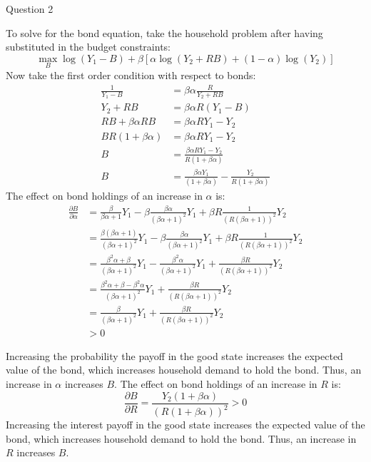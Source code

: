 \documentclass[a4paper]{article}
\newif\IfInSansMode
\begin{document}
\begin{questionbox}{Question 2}
\begin{enumerate}[(a)]
\begin{explanationbox}
					To solve for the bond equation, take the household problem after having substituted in the budget constraints:
					\[
						\max_B \log (Y_1 - B) + \beta \left[ \alpha \log (Y_2 + RB) + (1-\alpha)\log (Y_2) \right]
					\]
					Now take the ﬁrst order condition with respect to bonds:
					\begin{align*}
						\frac{1}{Y_1 - B} &= \beta\alpha \frac{R}{Y_2 + RB}\\
						Y_2 + RB &= \beta\alpha R (Y_1 - B)\\
						RB + \beta\alpha RB &= \beta\alpha RY_1-Y_2\\
						BR(1+\beta\alpha) &= \beta\alpha RY_1-Y_2\\
						B &= \frac{\beta\alpha RY_1-Y_2}{R(1+\beta\alpha)}\\
						B &= \frac{\beta\alpha Y_1}{(1+\beta\alpha)}-\frac{Y_2}{R(1+\beta\alpha)}
					\end{align*}
					The eﬀect on bond holdings of an increase in \( \alpha \) is:
					\begin{align*}
						\frac{\partial B}{\partial \alpha} &= \frac{\beta}{\beta\alpha + 1} Y_1 - \beta\frac{\beta\alpha}{(\beta\alpha + 1)^2}Y_1 + \beta R \frac{1}{(R(\beta\alpha +1))^2}Y_2\\
						&= \frac{\beta(\beta\alpha+1)}{(\beta\alpha+1)^2}Y_1 - \beta\frac{\beta\alpha}{(\beta\alpha+1)^2}Y_1 + \beta R \frac{1}{(R(\beta\alpha+1))^2}Y_2\\
						&= \frac{\beta^2\alpha+\beta}{(\beta\alpha+1)^2}Y_1 - \frac{\beta^2\alpha}{(\beta\alpha+1)^2}Y_1 + \frac{\beta R}{(R(\beta\alpha+1))^2}Y_2\\
						&= \frac{\beta^2\alpha+\beta-\beta^2\alpha}{(\beta\alpha+1)^2}Y_1 + \frac{\beta R}{(R(\beta\alpha+1))^2}Y_2\\
						&= \frac{\beta}{(\beta\alpha+1)^2}Y_1 + \frac{\beta R}{(R(\beta\alpha + 1))^2}Y_2\\
						&> 0
					\end{align*}
				\end{explanationbox}
				\begin{explanationbox}
					Increasing the probability the payoﬀ in the good state increases the expected value of the bond, which increases household demand to hold the bond. Thus, an increase in \( \alpha \) increases \( B \).
					The eﬀect on bond holdings of an increase in \( R \) is:
					\[
						\frac{\partial B}{\partial R} = \frac{Y_2(1+\beta\alpha)}{(R(1+\beta\alpha))^2} > 0
					\]
					Increasing the interest payoﬀ in the good state increases the expected value of the bond, which increases household demand to hold the bond. Thus, an increase in \( R \) increases \( B \).

\end{explanationbox}
\end{enumerate}
\end{questionbox}
\end{document}
